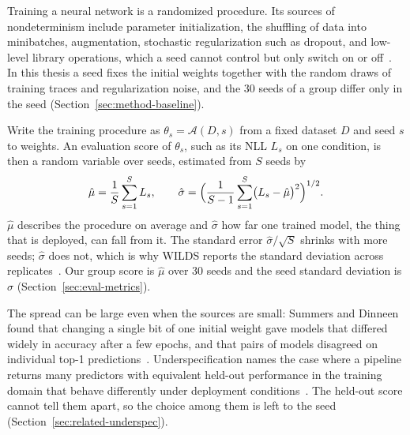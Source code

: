 Training a neural network is a randomized procedure. Its sources of
nondeterminism include parameter initialization, the shuffling of data
into minibatches, augmentation, stochastic regularization such as
dropout, and low-level library operations, which a seed cannot control
but only switch on or
off~\cite{summers2021nondeterminism,bouthillier2021accounting}.
In this thesis a seed fixes the initial weights together with the
random draws of training traces and regularization noise, and the 30
seeds of a group differ only in the seed
(Section~\ref{sec:method-baseline}).

Write the training procedure as $\theta_s=\mathcal{A}(D,s)$ from a
fixed dataset $D$ and seed $s$ to weights. An evaluation score of
$\theta_s$, such as its NLL $L_s$ on one condition, is then a random
variable over seeds, estimated from $S$ seeds by
\begin{equation}
  \hat{\mu}=\frac{1}{S}\sum_{s=1}^{S}L_s,
  \qquad
  \hat{\sigma}=\Bigl(\frac{1}{S-1}\sum_{s=1}^{S}\bigl(L_s-\hat{\mu}\bigr)^2\Bigr)^{1/2} .
  \label{eq:bg-seed-moments}
\end{equation}
$\hat{\mu}$ describes the procedure on average and $\hat{\sigma}$ how
far one trained model, the thing that is deployed, can fall from it.
The standard error $\hat{\sigma}/\sqrt{S}$ shrinks with more seeds;
$\hat{\sigma}$ does not, which is why WILDS reports the standard
deviation across replicates~\cite{koh2021wilds}. Our group score is
$\hat{\mu}$ over 30 seeds and the seed standard deviation is
$\hat{\sigma}$ (Section~\ref{sec:eval-metrics}).

The spread can be large even when the sources are small: Summers and
Dinneen found that changing a single bit of one initial weight gave
models that differed widely in accuracy after a few epochs, and that
pairs of models disagreed on individual top-1
predictions~\cite{summers2021nondeterminism}. Underspecification names
the case where a pipeline returns many predictors with equivalent
held-out performance in the training domain that behave differently
under deployment conditions~\cite{damour2020underspecification}. The
held-out score cannot tell them apart, so the choice among them is
left to the seed (Section~\ref{sec:related-underspec}).

